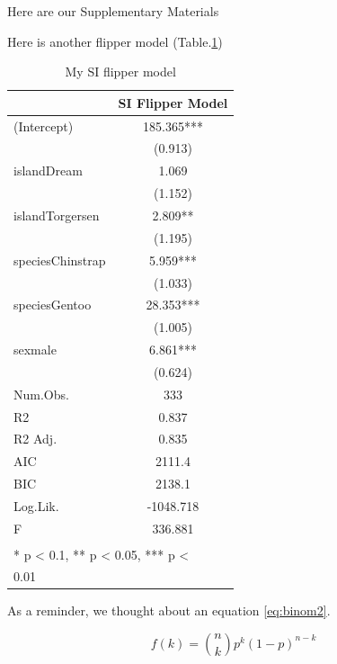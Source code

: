 \documentclass[
]{article}
\begin{document}
\renewcommand{\thefigure}{S\arabic{figure}}

\setcounter{figure}{0}

\renewcommand{\thetable}{S\arabic{table}}

\setcounter{table}{0}

\renewcommand{\theequation}{S\arabic{equation}}

\setcounter{equation}{0}

Here are our Supplementary Materials

Here is another flipper model (Table.\ref{tab:si-flipper-model})

\begin{table}

\caption{\label{tab:si-flipper-model}My SI flipper model}
\centering
\begin{tabular}[t]{lc}
\toprule
  & SI Flipper Model\\
\midrule
(Intercept) & 185.365***\\
 & (0.913)\\
islandDream & 1.069\\
 & (1.152)\\
islandTorgersen & 2.809**\\
 & (1.195)\\
speciesChinstrap & 5.959***\\
 & (1.033)\\
speciesGentoo & 28.353***\\
 & (1.005)\\
sexmale & 6.861***\\
 & (0.624)\\
\midrule
Num.Obs. & 333\\
R2 & 0.837\\
R2 Adj. & 0.835\\
AIC & 2111.4\\
BIC & 2138.1\\
Log.Lik. & -1048.718\\
F & 336.881\\
\bottomrule
\multicolumn{2}{l}{\textsuperscript{} * p < 0.1, ** p < 0.05, *** p <}\\
\multicolumn{2}{l}{0.01}\\
\end{tabular}
\end{table}

As a reminder, we thought about an equation \eqref{eq:binom2}.

\begin{equation} 
  f\left(k\right) = \binom{n}{k} p^k\left(1-p\right)^{n-k}
  \label{eq:binom2}
\end{equation}
\end{document}
